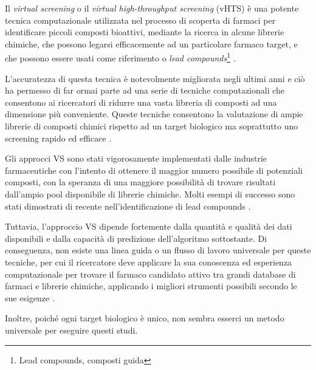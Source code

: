 Il \textit{virtual screening} o il \textit{virtual high-throughput screening} (vHTS) è una potente tecnica computazionale utilizzata nel processo di scoperta di farmaci per identificare piccoli composti bioattivi, mediante la ricerca in alcune librerie chimiche, che possono legarsi efficacemente ad un particolare farmaco target, e che possono essere usati come riferimento o \textit{lead compounds}\footnote{Lead compounds, composti guida} \cite{naqvi_advancements_nodate}.

L'accuratezza di questa tecnica è notevolmente migliorata negli ultimi anni e ciò ha permesso di far ormai parte ad una serie di tecniche computazionali che consentono ai ricercatori di ridurre una vasta libreria di composti ad una dimensione più conveniente. Queste tecniche consentono la valutazione di ampie librerie di composti chimici rispetto ad un target biologico ma soprattutto uno screening rapido ed efficace \cite{naqvi_advancements_nodate}.

Gli approcci VS sono stati vigorosamente implementati dalle industrie farmaceutiche con l'intento di ottenere il maggior numero possibile di potenziali composti, con la speranza di una maggiore possibilità di trovare risultati dall'ampio pool disponibile di librerie chimiche. Molti esempi di successo sono stati dimostrati di recente nell'identificazione di lead compounds \cite{roy_chapter_2015}.

Tuttavia, l'approccio VS dipende fortemente dalla quantità e qualità dei dati disponibili e dalla capacità di predizione dell'algoritmo sottostante. Di conseguenza, non esiste una linea guida o un flusso di lavoro universale per queste tecniche, per cui il ricercatore deve applicare la sua conoscenza ed esperienza computazionale per trovare il farmaco candidato attivo tra grandi database di farmaci e librerie chimiche, applicando i migliori strumenti possibili secondo le sue esigenze \cite{roy_chapter_2015}.

Inoltre, poiché ogni target biologico è unico, non sembra esserci un metodo universale per eseguire questi studi.

